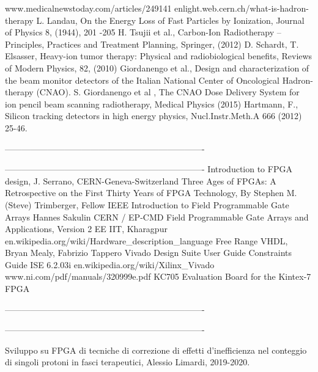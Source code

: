 \begin{thebibliography}{00}	
	www.medicalnewstoday.com/articles/249141
	enlight.web.cern.ch/what-is-hadron-therapy
	L. Landau, On the Energy Loss of Fast Particles by Ionization, Journal of
	Physics 8, (1944), 201 -205
	H. Tsujii et al., Carbon-Ion Radiotherapy – Principles, Practices and Treatment
	Planning, Springer, (2012)
	D. Schardt, T. Elsasser, Heavy-ion tumor therapy: Physical and radiobiological
	benefits, Reviews of Modern Physics, 82, (2010)
	Giordanengo et al., Design and characterization of the beam monitor detectors
	of the Italian National Center of Oncological Hadron-therapy (CNAO).
	S. Giordanengo et al , The CNAO Dose Delivery System for ion pencil beam
	scanning radiotherapy, Medical Physics (2015)
	Hartmann, F., Silicon tracking detectors in high energy physics, Nucl.Instr.Meth.A
	666 (2012) 25-46.
	
	----------------------------------------------------------------------
	
	----------------------------------------------------------------------
	Introduction to FPGA design, J. Serrano, CERN-Geneva-Switzerland
	Three Ages of FPGAs: A Retrospective on the First Thirty Years of FPGA Technology, By Stephen M. (Steve) Trimberger, Fellow IEEE
	Introduction to Field Programmable Gate Arrays Hannes Sakulin CERN / EP-CMD
	Field Programmable Gate Arrays and Applications, Version 2 EE IIT, Kharagpur
	en.wikipedia.org/wiki/Hardware\_description\_language
	Free Range VHDL, Bryan Mealy, Fabrizio Tappero
	Vivado Design Suite User Guide
	Constraints Guide ISE 6.2.03i
	en.wikipedia.org/wiki/Xilinx\_Vivado
	www.ni.com/pdf/manuals/320999e.pdf
	KC705 Evaluation Board for the Kintex-7 FPGA

	
	----------------------------------------------------------------------
	
	
	----------------------------------------------------------------------
	
	Sviluppo su FPGA di tecniche di correzione di effetti d'inefficienza nel conteggio di singoli protoni in fasci terapeutici, Alessio Limardi, 2019-2020.
	
\end{thebibliography}
